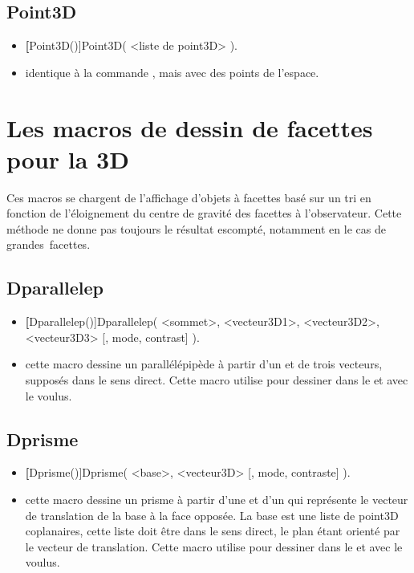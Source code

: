 \subsection{Point3D}
\begin{itemize}
 \item \util \textbf[Point3D()]{Point3D( <liste de point3D> )}.
 \item \desc identique à la commande , mais avec des points de l'espace.
\end{itemize}


\section{Les macros de dessin de facettes pour la 3D}

Ces macros se chargent de l'affichage d'objets à facettes basé sur un tri en fonction de l'éloignement du centre de gravité des facettes à l'observateur. Cette méthode ne donne pas toujours le résultat escompté, notamment en le cas de \og grandes\fg\ facettes.


\subsection{Dparallelep}
\begin{itemize}
 \item \util \textbf[Dparallelep()]{Dparallelep( <sommet>, <vecteur3D1>, <vecteur3D2>, <vecteur3D3> [, mode, contrast] )}.
 \item \desc cette macro dessine un parallélépipède à partir d'un  et de trois vecteurs, supposés dans le sens direct. Cette macro utilise  pour dessiner dans le  et avec le  voulus.
\end{itemize}

\subsection{Dprisme}
\begin{itemize}
 \item \util \textbf[Dprisme()]{Dprisme( <base>, <vecteur3D> [, mode, contraste] )}.
 \item \desc cette macro dessine un prisme à partir d'une  et d'un  qui représente le vecteur de translation de la base à la face opposée. La base est une liste de point3D coplanaires, cette liste doit être dans le sens direct, le plan étant orienté par le vecteur de translation. Cette macro utilise  pour dessiner dans le  et avec le  voulus.
\end{itemize}

